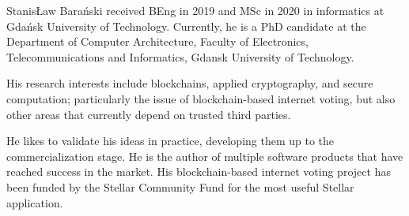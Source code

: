 \documentclass{ieeeaccess}
\begin{document}


\EOD


\begin{IEEEbiography}{Stanis\L{}aw Bara{\'n}ski} received BEng in 2019 and MSc in 2020 in informatics at Gdańsk University of Technology. 
Currently, he is a PhD candidate at the Department of Computer Architecture, Faculty of Electronics, Telecommunications and Informatics, Gdansk University of Technology.

His research interests include blockchains, applied cryptography, and secure computation; particularly the issue of blockchain-based internet voting, but also other areas that currently depend on trusted third parties.

He likes to validate his ideas in practice, developing them up to the commercialization stage. He is the author of multiple software products that have reached success in the market. His blockchain-based internet voting project has been funded by the Stellar Community Fund for the most useful Stellar application.
\end{IEEEbiography}
\end{document}
